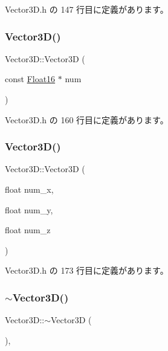  Vector3\+D.\+h の 147 行目に定義があります。

\mbox{\label{class_vector3_d_af5bdf4c49bc5804bb8aaa56f08007553}} 
\subsubsection{\texorpdfstring{Vector3\+D()}{Vector3D()}\hspace{0.1cm}{\footnotesize\ttfamily [4/5]}}
{\footnotesize\ttfamily Vector3\+D\+::\+Vector3D (\begin{DoxyParamCaption}\item[{const \mbox{\hyperlink{_vector3_d_8h_afe61185afc2bf3856c12613d99eede01}{Float16}} $\ast$}]{num }\end{DoxyParamCaption})\hspace{0.3cm}{\ttfamily [inline]}}



 Vector3\+D.\+h の 160 行目に定義があります。

\mbox{\label{class_vector3_d_a01f2964e8b01e8e146eb4eca9ad36d2b}} 
\subsubsection{\texorpdfstring{Vector3\+D()}{Vector3D()}\hspace{0.1cm}{\footnotesize\ttfamily [5/5]}}
{\footnotesize\ttfamily Vector3\+D\+::\+Vector3D (\begin{DoxyParamCaption}\item[{float}]{num\+\_\+x,  }\item[{float}]{num\+\_\+y,  }\item[{float}]{num\+\_\+z }\end{DoxyParamCaption})\hspace{0.3cm}{\ttfamily [inline]}}



 Vector3\+D.\+h の 173 行目に定義があります。

\mbox{\label{class_vector3_d_ae4fde5759270bf5bcf615f12f0823a8c}} 
\subsubsection{\texorpdfstring{$\sim$\+Vector3\+D()}{~Vector3D()}}
{\footnotesize\ttfamily Vector3\+D\+::$\sim$\+Vector3D (\begin{DoxyParamCaption}{ }\end{DoxyParamCaption})\hspace{0.3cm}{\ttfamily [inline]}, {\ttfamily [virtual]}}



